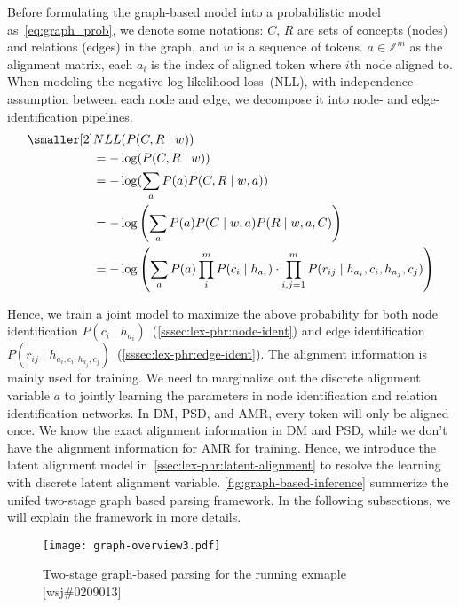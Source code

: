 Before formulating the graph-based model into a probabilistic model
as~\autoref{eq:graph_prob}, we denote some notations: $C$, $R$ are
sets of concepts (nodes) and relations (edges) in the graph, and $w$
is a sequence of tokens.  $a \in {\mathbb{Z}}^m$ as the alignment
matrix, each $a_{i}$ is the index of aligned token where $i$th node
aligned to. When modeling the negative log likelihood loss~(NLL), with
independence assumption between each node and edge, we decompose it
into node- and edge-identification pipelines.
\begin{equation}
  \label{eq:graph_prob}
\begin{aligned} \smaller[2]
 & NLL(P(C,R \mid w)) \\
 & = - \log(P(C,R \mid w)) \\
 & = - \log(\sum_{a}{P(a) P(C,R \mid w,a)}) \\
 & = - \log\left(\sum_{a}P(a) P(C \mid w, a) P(R\mid w,a,C)\right) \\
 & = - \log\left(\sum_{a}P(a) \prod_{i}^{m} P(c_{i} \mid h_{a_{i}}) \cdot \prod_{i,j=1}^{m}P(r_{ij} \mid h_{a_{i}}, c_{i}, h_{a_{j}}, c_{j})\right)
\end{aligned}
\end{equation}

Hence, we train a joint model to maximize the above probability for
both node identification
$P(c_{i} \mid h_{a_{i}})$~(\autoref{sssec:lex-phr:node-ident}) and edge
identification
$P(r_{ij} \mid h_{{a_{i}}, c_{i},h_{a_{j}},
  c_{j}})$~(\autoref{sssec:lex-phr:edge-ident}). The alignment
information is mainly used for training. We need to marginalize out
the discrete alignment variable $a$ to jointly learning the parameters
in node identification and relation identification networks. In DM,
PSD, and AMR, every token will only be aligned once. We know the exact
alignment information in DM and PSD, while we don't have the alignment
information for AMR for training. Hence, we introduce the latent
alignment model in~\autoref{ssec:lex-phr:latent-alignment} to resolve
the learning with discrete latent alignment
variable. \autoref{fig:graph-based-inference} summerize the unifed
two-stage graph based parsing framework. In the following subsections,
we will explain the framework in more details.

\begin{figure}[!tbp] \centering
  \texttt{[image: graph-overview3.pdf]}
  \caption{\label{fig:graph-based-inference} Two-stage graph-based
    parsing for the running exmaple [wsj\#0209013]}
\end{figure}

